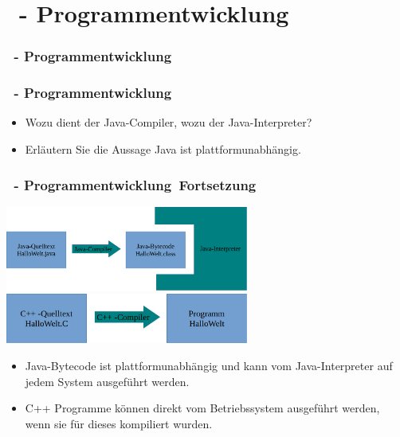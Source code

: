 \def\stitle{\theexercise\ - Programmentwicklung}
\section{\stitle}
\begin{frame}%
  \frametitle{\stitle}%
\tableofcontents[current]
\end{frame}


\begin{frame}%
  \frametitle{\stitle}%

\begin{itemize}
\item Wozu dient der Java-Compiler, wozu der Java-Interpreter?
\item Erläutern Sie die Aussage \glqq Java ist plattformunabhängig\grqq.
\end{itemize}

\end{frame}


\begin{frame}[t]%
  \frametitle{\stitle\ Fortsetzung}%
\centering

\includegraphics[width=0.6\textwidth]{grundl-java/Java-Kompiler}\\[2em]
\includegraphics[width=0.6\textwidth]{grundl-java/C++-Kompiler}

\begin{itemize}
 \item Java-Bytecode ist plattformunabhängig und kann vom Java-Interpreter auf jedem System ausgeführt werden.
 \item C++ Programme können direkt vom Betriebssystem ausgeführt werden, wenn sie für dieses kompiliert wurden.
\end{itemize}

\end{frame}
